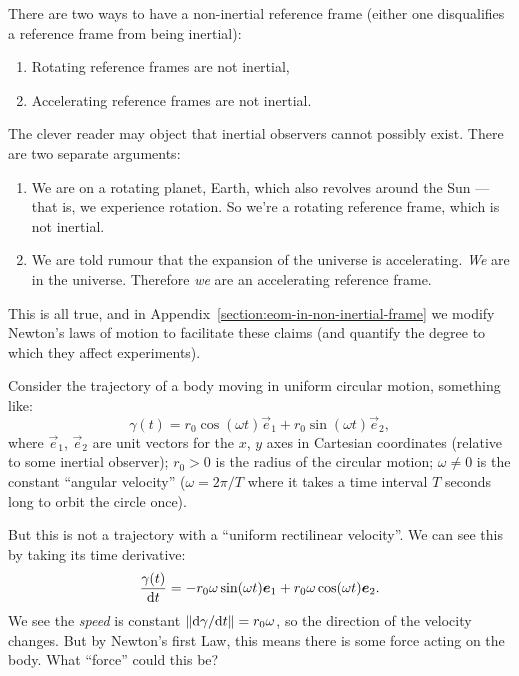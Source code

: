 There are two ways to have a non-inertial reference frame (either one
disqualifies a reference frame from being inertial):
\begin{enumerate}[label=(\arabic*)]
\item Rotating reference frames are not inertial,
\item Accelerating reference frames are not inertial.
\end{enumerate}

The clever reader may object that inertial observers cannot possibly
exist. There are two separate arguments:
\begin{enumerate}[label=(\arabic*)]
\item We are on a rotating planet, Earth, which also revolves around the
  Sun --- that is, we experience rotation. So we're a rotating reference
  frame, which is not inertial.
\item We are told rumour that the expansion of the universe is
  accelerating. \emph{We} are in the universe. Therefore \emph{we} are
  an accelerating reference frame.
\end{enumerate}
This is all true, and in
Appendix~\ref{section:eom-in-non-inertial-frame} we modify Newton's
laws of motion to facilitate these claims (and quantify the degree to
which they affect experiments).

Consider the trajectory of a body moving in uniform circular motion,
something like:
\begin{equation}
\gamma(t) = r_{0}\cos(\omega t)\vec{e}_{1} + r_{0}\sin(\omega t)\vec{e}_{2},
\end{equation}
where $\vec{e}_{1}$, $\vec{e}_{2}$ are unit vectors for the $x$, $y$
axes in Cartesian coordinates (relative to some inertial observer);
$r_{0}>0$ is the radius of the circular motion; $\omega\neq0$ is the
constant ``angular velocity'' ($\omega=2\pi/T$ where it takes a time
interval $T$ seconds long to orbit the circle once).

But this is not a trajectory with a ``uniform rectilinear velocity''. We
can see this by taking its time derivative:
\begin{equation}
\frac{\gamma(t)}{\mathrm{d} t} = -r_{0}\omega\sin(\omega t)\boldsymbol{e}_{1} + r_{0}\omega\cos(\omega t)\boldsymbol{e}_{2}.
\end{equation}
We see the \emph{speed} is constant $\|\mathrm{d}\gamma/\mathrm{d} t\|=r_{0}\omega$, so
the direction of the velocity changes.
But by Newton's first Law, this means there is some force acting on the
body. What ``force'' could this be?

